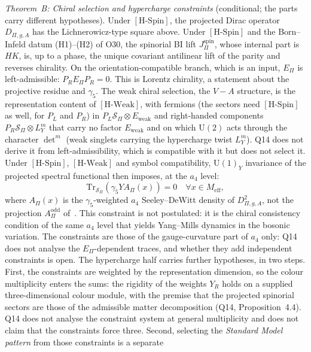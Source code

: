 \documentclass[11pt,a4paper]{article}
\theoremstyle{definition}
\newcommand{\UU}{\mathrm{U}}
\newcommand{\Sbundle}{\mathcal{S}_\Pi}
\newcommand{\Epi}{E_\Pi}
\newcommand{\Dpi}{D_{\Pi,g,A}}
\newcommand{\Ew}{E_{\mathrm{weak}}}
\newcommand{\HSpin}{\ensuremath{[\mathrm{H\text{-}Spin}]}}
\newcommand{\HWeak}{\ensuremath{[\mathrm{H\text{-}Weak}]}}
\newcommand{\JBI}{{J^{\mathrm{spin}}_\Pi}}
\newcommand{\AOdd}{A_\Pi^{\mathrm{odd}}}
\begin{document}
      \textit{Theorem~B: Chiral selection and hypercharge constraints} (conditional; the parts carry different
      hypotheses).
      Under \HSpin{}, the projected Dirac operator $\Dpi$ has the Lichnerowicz-type square above.
      Under \HSpin{} and the Born--Infeld datum (H1)--(H2) of O30, the spinorial BI lift $\JBI$, whose internal
      part is $HK$, is, up to a phase, the
      unique covariant antilinear lift of the parity and reverses chirality.
      On the orientation-compatible branch, which is an input, $\Epi$ is left-admissible: $P_R \Epi P_R = 0$.
      This is Lorentz chirality, a statement about the projective residue and $\gamma_5$.
      The weak chiral selection, the $V-A$ structure, is the representation content of \HWeak{},
      with fermions (the sectors need \HSpin{} as well,
      for $P_L$ and $P_R$) in $P_L \Sbundle \otimes \Ew$ and right-handed components $P_R\Sbundle\otimes L_Y^m$
      that carry no factor $\Ew$ and on which $\UU(2)$ acts through the character $\det^m$
      (weak singlets carrying the hypercharge twist $L_Y^m$).
      Q14 does not derive it from left-admissibility, which is compatible with it but does not select it.
      Under \HSpin{}, \HWeak{} and symbol compatibility, $\UU(1)_Y$ invariance of the projected spectral functional
      then imposes, at the $a_4$ level:
      \[
        \mathrm{Tr}_{\Sbundle}(\gamma_5 Y A_\Pi(x)) = 0 \quad \forall x \in M_{\mathrm{eff}},
      \]
      where $A_\Pi(x)$ is the $\gamma_5$-weighted $a_4$ Seeley--DeWitt density of $D^2_{\Pi,g,A}$, not the
      projection $\AOdd$ of~\cite{Beau2026pyo}.
      This constraint is not postulated: it is the chiral consistency condition of the same $a_4$
      level that yields Yang--Mills dynamics in the bosonic variation.
      The constraints are those of the gauge-curvature part of $a_4$ only: Q14 does not analyse the
      $\Epi$-dependent traces, and whether they add independent constraints is open.
      The hypercharge half carries further hypotheses, in two steps.
      First, the constraints are weighted by the representation dimension, so the colour
      multiplicity enters the sums: the rigidity of the weights $Y_R$ holds on a supplied
      three-dimensional colour module, with the premise that the projected spinorial sectors are those of the
      admissible matter decomposition (Q14, Proposition~4.4).
      Q14 does not analyse the constraint system at general multiplicity and does not claim that the
      constraints force three.
      Second, selecting the \emph{Standard Model pattern} from those constraints is a separate
\end{document}
